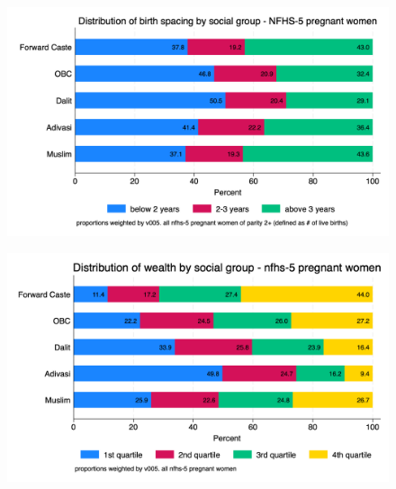 \documentclass{article}
\begin{document}
\begin{figure}[H]
    \centering
    \includegraphics[width=\textwidth]{figures/birth spacing distribution of pregnant women by social group.png}
\end{figure}

\newpage
\begin{figure}[H]
    \centering
    \includegraphics[width=\textwidth]{figures/wealth distribution of pregnant women by social group.png}
\end{figure}
\end{document}
